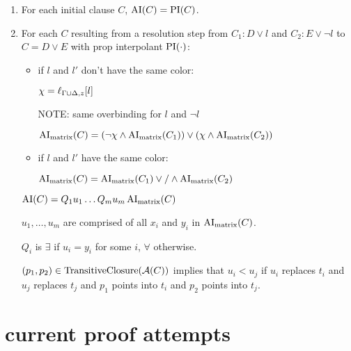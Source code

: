 \documentclass[,%
	paper=a4,%
	DIV14, 
	liststotoc,
	bibtotoc,
	draft=false,%
	numbers=noendperiod
]{scrartcl}
\begin{document}
\begin{enumerate}
	\item 
		For each initial clause $C$, $\operatorname{AI}(C) = \operatorname{PI}(C)$.

	\item
		For each $C$ resulting from a resolution step from $C_1: D\lor l$ and $C_2: E\lor \lnot l$ to $C = D \lor E$ with prop interpolant $\operatorname{PI}(\cdot)$:

		\begin{itemize}
			\item if $l$ and $l'$ don't have the same color:

				$\chi = \ell_{\Gamma\cup\Delta,z}[l]$
				
				NOTE: same overbinding for $l$ and $\lnot l$

				$\operatorname{AI}_\text{matrix}(C) = (\lnot \chi \land \operatorname{AI}_\text{matrix}(C_1)) \lor (\chi \land \operatorname{AI}_\text{matrix}(C_2))$ 

			
			\item if $l$ and $l'$ have the same color:

				$\operatorname{AI}_\text{matrix}(C) = \operatorname{AI}_\text{matrix}(C_1) \lor/\land \operatorname{AI}_\text{matrix}(C_2)$

		\end{itemize}

	$\operatorname{AI}(C) = Q_1 u_1 \ldots Q_m u_m \operatorname{AI}_\text{matrix}(C)$

				$u_1, \ldots, u_m$ are comprised of all $x_i$ and $y_i$ in $\operatorname{AI}_\text{matrix}(C)$.

				$Q_i$ is $\exists$ if $u_i = y_i$ for some $i$, $\forall$ otherwise.

				$(p_1, p_2) \in \operatorname{TransitiveClosure}(\mathcal{A}(C))$ implies that $u_i < u_j$ if $u_i$ replaces $t_i$ and $u_j$ replaces $t_j$ and $p_1$ points into $t_i$ and $p_2$ points into $t_j$.

\end{enumerate}

\clearpage

\section{current proof attempts}
\end{document}
